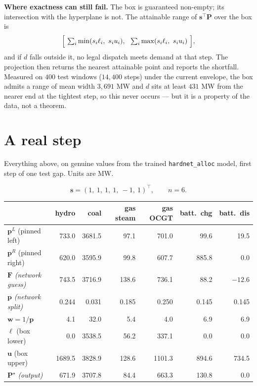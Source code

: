 \documentclass[11pt]{article}
\newcommand{\s}{\mathbf{s}}
\newcommand{\F}{\mathbf{F}}
\newcommand{\Pv}{\mathbf{P}}
\newcommand{\lo}{\bm{\ell}}
\newcommand{\hi}{\mathbf{u}}
\begin{document}
\medskip\noindent
\textbf{Where exactness can still fail.} The box is guaranteed non-empty; its
intersection with the hyperplane is not. The attainable range of
$\s^{\!\top}\Pv$ over the box is
\[
  \Bigl[\ \textstyle\sum_i \min(s_i\ell_i,\ s_iu_i),\ \ \sum_i \max(s_i\ell_i,\ s_iu_i)\ \Bigr],
\]
and if $d$ falls outside it, no legal dispatch meets demand at that step. The
projection then returns the nearest attainable point and reports the shortfall.
Measured on $400$ test windows ($14{,}400$ steps) under the current envelope, the
box admits a range of mean width $3{,}691$ MW and $d$ sits at least $431$ MW from
the nearer end at the tightest step, so this never occurs --- but it is a
property of the data, not a theorem.

\section{A real step}
\label{sec:real}

Everything above, on genuine values from the trained \texttt{hardnet\_alloc}
model, first step of one test gap. Units are MW.

\[
  \s = (1,\ 1,\ 1,\ 1,\ -1,\ 1)^{\!\top}, \qquad n = 6 .
\]

\begin{center}
\small
\begin{tabular}{lrrrrrr}
\toprule
 & hydro & coal & gas steam & gas OCGT & batt.\ chg & batt.\ dis \\
\midrule
$\mathbf{p}^L$ (pinned left)   &  733.0 & 3681.5 &  97.1 &  701.0 &  99.6 & 19.5 \\
$\mathbf{p}^R$ (pinned right)  &  620.0 & 3595.9 &  99.8 &  607.7 & 885.8 &  0.0 \\
\midrule
$\F$ \emph{(network guess)}    &  743.5 & 3716.9 & 138.6 &  736.1 &  88.2 & $-12.6$ \\
$\mathbf{p}$ \emph{(network split)} & 0.244 & 0.031 & 0.185 & 0.250 & 0.145 & 0.145 \\
$\mathbf{w} = 1/\mathbf{p}$    &   4.1 &   32.0 &   5.4 &    4.0 &   6.9 &  6.9 \\
\midrule
$\lo$ (box lower)              &    0.0 & 3538.5 &  56.2 &  337.1 &   0.0 &  0.0 \\
$\hi$ (box upper)              & 1689.5 & 3828.9 & 128.6 & 1101.3 & 894.6 & 734.5 \\
\midrule
$\Pv^\star$ \emph{(output)}    &  671.9 & 3707.8 &  84.4 &  663.3 & 130.8 &  0.0 \\
\bottomrule
\end{tabular}
\end{center}
\end{document}

